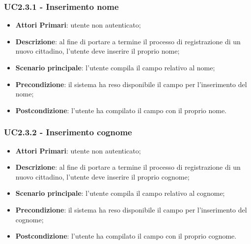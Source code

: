 \subsubsection{UC2.3.1 - Inserimento nome}
\begin{itemize}
	\item \textbf{Attori Primari}: utente non autenticato;
	\item \textbf{Descrizione}: al fine di portare a termine il processo di registrazione di un nuovo cittadino, l'utente deve inserire il proprio nome;
	\item \textbf{Scenario principale}: l'utente compila il campo relativo al nome;
	\item \textbf{Precondizione}: il sistema ha reso disponibile il campo per l'inserimento del nome;
	\item \textbf{Postcondizione}: l'utente ha compilato il campo con il proprio nome.
\end{itemize}
\subsubsection{UC2.3.2 - Inserimento cognome}
\begin{itemize}
	\item \textbf{Attori Primari}: utente non autenticato;
	\item \textbf{Descrizione}: al fine di portare a termine il processo di registrazione di un nuovo cittadino, l'utente deve inserire il proprio cognome;
	\item \textbf{Scenario principale}: l'utente compila il campo relativo al cognome;
	\item \textbf{Precondizione}: il sistema ha reso disponibile il campo per l'inserimento del cognome;
	\item \textbf{Postcondizione}: l'utente ha compilato il campo con il proprio cognome.
\end{itemize}

